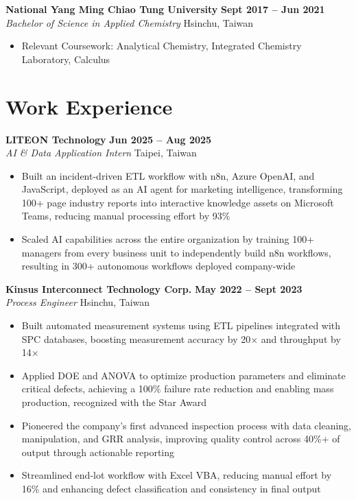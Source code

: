 \documentclass[letterpaper,11pt]{article}
\begin{document}
\medskip

\textbf{National Yang Ming Chiao Tung University} \hfill \textbf{Sept 2017 -- Jun 2021}\\
\textit{Bachelor of Science in Applied Chemistry} \hfill Hsinchu, Taiwan
\begin{itemize}
  \item Relevant Coursework: Analytical Chemistry, Integrated Chemistry Laboratory, Calculus
\end{itemize}

\section{Work Experience}

\textbf{LITEON Technology} \hfill \textbf{Jun 2025 -- Aug 2025}\\
\textit{AI \& Data Application Intern} \hfill Taipei, Taiwan
\begin{itemize}
  \item Built an incident-driven ETL workflow with n8n, Azure OpenAI, and JavaScript, deployed as an AI agent
        for marketing intelligence, transforming 100+ page industry reports into interactive knowledge assets
        on Microsoft Teams, reducing manual processing effort by 93\%
  \item Scaled AI capabilities across the entire organization by training 100+ managers from every business unit
        to independently build n8n workflows, resulting in 300+ autonomous workflows deployed company-wide
\end{itemize}

\medskip

\textbf{Kinsus Interconnect Technology Corp.} \hfill \textbf{May 2022 -- Sept 2023}\\
\textit{Process Engineer} \hfill Hsinchu, Taiwan
\begin{itemize}
  \item Built automated measurement systems using ETL pipelines integrated with SPC databases, boosting
        measurement accuracy by 20$\times$ and throughput by 14$\times$
  \item Applied DOE and ANOVA to optimize production parameters and eliminate critical defects, achieving a
        100\% failure rate reduction and enabling mass production, recognized with the Star Award
  \item Pioneered the company's first advanced inspection process with data cleaning, manipulation, and GRR
        analysis, improving quality control across 40\%+ of output through actionable reporting
  \item Streamlined end-lot workflow with Excel VBA, reducing manual effort by 16\% and enhancing defect
        classification and consistency in final output
\end{itemize}
\end{document}
